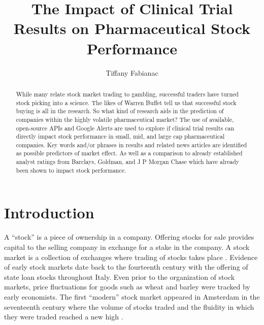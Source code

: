 \documentclass[sigconf]{acmart}
\begin{document}
\title{The Impact of Clinical Trial Results on Pharmaceutical Stock Performance}

\author{Tiffany Fabianac} 
 \renewcommand{\shortauthors}{T. Fabianac} 

\begin{abstract}
While many relate stock market trading to gambling, successful traders have turned stock picking into a science. The likes of Warren Buffet tell us that successful stock buying is all in the research. So what kind of research aids in the prediction of companies within the highly volatile pharmaceutical market? The use of available, open-source APIs and Google Alerts are used to explore if clinical trial results can directly impact stock performance in small, mid, and large cap pharmaceutical companies. Key words and/or phrases in results and related news articles are identified as possible predictors of market effect. As well as a comparison to already established analyst ratings from Barclays, Goldman, and J P Morgan Chase which have already been shown to impact stock performance.
\end{abstract}

\maketitle
\section{Introduction}
A ``stock'' is a piece of ownership in a company. Offering stocks for sale provides capital to the selling company in exchange for a stake in the company. A stock market is a collection of exchanges where trading of stocks takes place \cite{www-investopedia}. Evidence of early stock markets date back to the fourteenth century with the offering of state loan stocks throughout Italy. Even prior to the organization of stock markets, price fluctuations for goods such as wheat and barley were tracked by early economists. The first ``modern'' stock market appeared in Amsterdam in the seventeenth century where the volume of stocks traded and the fluidity in which they were traded reached a new high \cite{Braudel}. 
\end{document}
